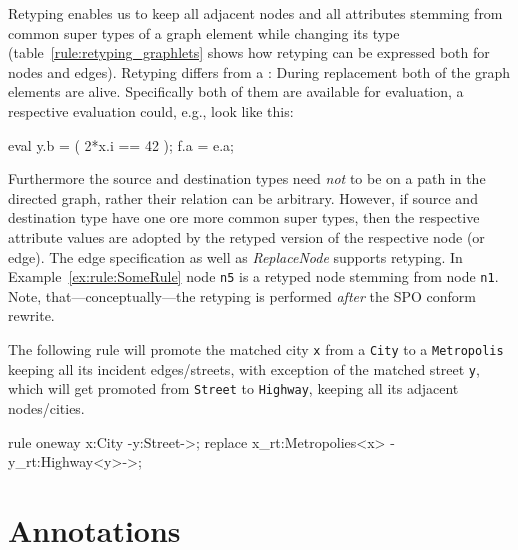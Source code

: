 Retyping enables us to keep all adjacent nodes and all attributes stemming from common super types of a graph element while changing its type (table~\ref{rule:retyping_graphlets} shows how retyping can be expressed both for nodes and edges).
Retyping differs from a : During replacement both of the graph elements are alive.
  Specifically both of them are available for evaluation, a respective evaluation could, e.g., look like this:
  \begin{grgenlet}
eval {
  y.b = ( 2*x.i == 42 );
  f.a = e.a;
}
  \end{grgenlet}
Furthermore the source and destination types need \emph{not} to be on a path in the directed  graph, rather their relation can be arbitrary.
However, if source and destination type have one ore more common super types, then the respective attribute values are adopted by the retyped version of the respective node (or edge).
The edge specification as well as \emph{ReplaceNode} supports retyping. 
In Example~\ref{ex:rule:SomeRule} node \texttt{n5} is a retyped node stemming from node \texttt{n1}.
Note, that---conceptually---the retyping is performed \emph{after} the SPO conform rewrite.

\begin{example}
The following rule will promote the matched city \texttt{x} from a \texttt{City} to a \texttt{Metropolis} keeping all its incident edges/streets, 
with exception of the matched street \texttt{y}, which will get promoted from \texttt{Street} to \texttt{Highway}, keeping all its adjacent nodes/cities.
\begin{grgen}
rule oneway {
    x:City -y:Street->;
    replace {
		x_rt:Metropolies<x> -y_rt:Highway<y>->;
    }
}
\end{grgen}
\end{example}


\section{Annotations}
\label{annotations}

